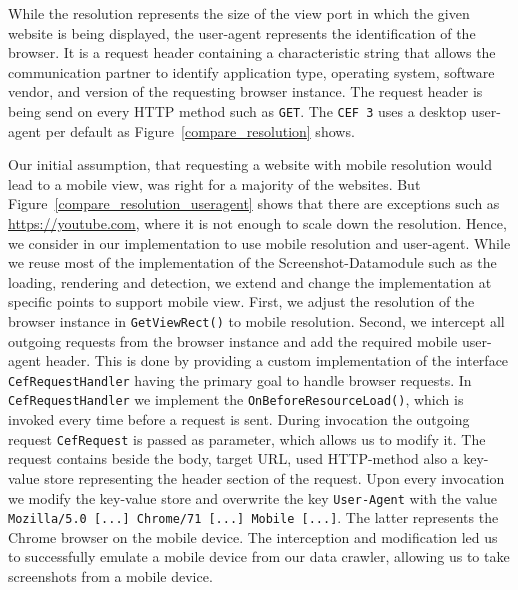 While the resolution represents the size of the view port in which the given website is being displayed, the user-agent represents the identification of the browser. It is a request header containing a characteristic string that allows the communication partner to identify application type, operating system, software vendor, and version of the requesting browser instance. The request header is being send on every HTTP method such as \texttt{GET}. The \texttt{CEF 3} uses a desktop user-agent per default as Figure~\ref{compare_resolution} shows.

Our initial assumption, that requesting a website with mobile resolution would lead to a mobile view, was right for a majority of the websites. But Figure~\ref{compare_resolution_useragent} shows that there are exceptions such as \url{https://youtube.com}, where it is not enough to scale down the resolution. Hence, we consider in our implementation to use mobile resolution and user-agent. While we reuse most of the implementation of the Screenshot-Datamodule such as the loading, rendering and detection, we extend and change the implementation at specific points to support mobile view.
First, we adjust the resolution of the browser instance in \texttt{GetViewRect()} to mobile resolution.
Second, we intercept all outgoing requests from the browser instance and add the required mobile user-agent header. This is done by providing a custom implementation of the interface \texttt{CefRequestHandler} having the primary goal to handle browser requests. In \texttt{CefRequestHandler} we implement the \texttt{OnBeforeResourceLoad()}, which is invoked every time before a request is sent. During invocation the outgoing request \texttt{CefRequest} is passed as parameter, which allows us to modify it. The request contains beside the body, target URL, used HTTP-method also a key-value store representing the header section of the request. Upon every invocation we modify the key-value store and overwrite the key \texttt{User-Agent} with the value \texttt{Mozilla/5.0 [...] Chrome/71 [...] Mobile [...]}. The latter represents the Chrome browser on the mobile device. The interception and modification led us to successfully emulate a mobile device from our data crawler, allowing us to take screenshots from a mobile device.

